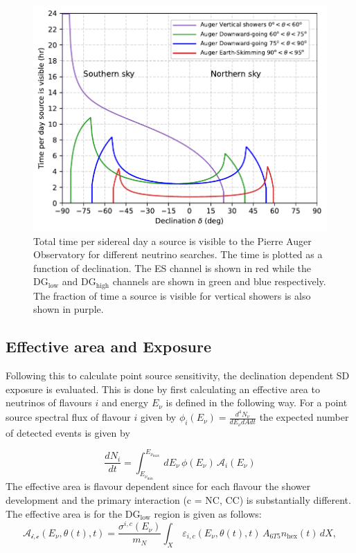 \begin{figure}[t!]
  \centering
  \includegraphics[width=14.5cm]{thesis_figures/PointLimits/Time_per_day.pdf}
  \caption{Total time per sidereal day a source is visible to the Pierre Auger Observatory for different neutrino searches. The time is plotted as a function of declination. The ES channel is shown in red while the DG$\mathrm{_{\text{low}}}$ and DG$\mathrm{_{\text{high}}}$ channels are shown in green and blue respectively. The fraction of time a source is visible for vertical showers is also shown in purple.}
  \label{fig:time_per_day}
\end{figure}

\subsection{Effective area and Exposure}
\label{subsec:psource_area}
Following this to calculate point source sensitivity, the declination dependent SD exposure is evaluated. This is done by first calculating an effective area to neutrinos of flavours $i$ and energy $E_{\nu}$ is defined in the following way. For a point source spectral flux of flavour $i$ given by $\phi_i(E_{\nu}) = \frac{d^4 N_{\nu}}{dE_{\nu} dA dt}$ the expected number of detected events is given by 

\begin{equation}
  \label{eq:expected_events_point}
  \frac{dN_{i}}{dt} = \int_{E_{\nu_{\text{min}}}}^{E_{\nu_{\text{max}}}} \, dE_{\nu} \, \phi(E_{\nu}) \, \mathcal{A}_i(E_{\nu})
\end{equation}
The effective area is flavour dependent since for each flavour the shower development and the primary interaction (c = NC, CC) is substantially different. The effective area is for the DG$\mathrm{_{\text{low}}}$ region is given as follows:
\begin{equation}
  \label{eq:effective_area}
  \mathcal{A_{i,c}}(E_{\nu},\theta(t),t) = \frac{\sigma^{i,c}(E_{\nu})}{m_N} \int_{X} \, \varepsilon_{i,c}(E_{\nu},\theta(t),t) \, A_{6T5} n_{\text{hex}}(t) \, dX,
\end{equation}

